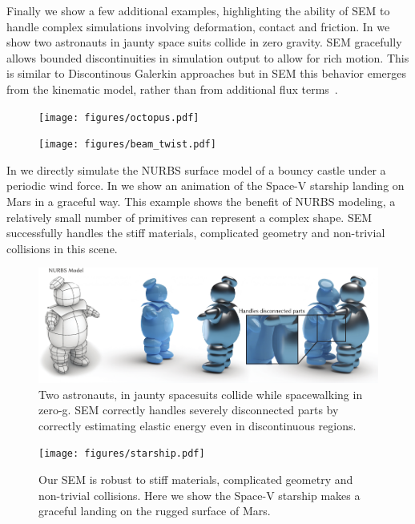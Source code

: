 Finally we show a few additional examples, highlighting the ability of SEM to handle complex simulations involving deformation, contact and friction.
In  we show two astronauts in jaunty space suits collide in zero gravity. 
SEM gracefully allows bounded discontinuities in simulation output to allow for rich motion. 
This is similar to Discontinous Galerkin approaches but in SEM this behavior emerges from the kinematic model, rather than from additional flux terms~\cite{kaufmann2009flexible}.

\begin{figure}[h]
  \texttt{[image: figures/octopus.pdf]}
  \caption{}
  \label{fig:octopus}
\end{figure}

\begin{figure}[h]
  \texttt{[image: figures/beam\_twist.pdf]}
  \caption{}
  \label{fig:twist}
\end{figure}

In  we directly simulate the NURBS surface model of a bouncy castle under a periodic wind force. 
In  we show an animation of the Space-V starship landing on Mars in a graceful way. 
This example shows the benefit of NURBS modeling, a relatively small number of primitives can represent a complex shape.
SEM successfully handles the stiff materials, complicated geometry and non-trivial collisions in this scene.

\begin{figure}[htp]
  \includegraphics[width=\textwidth]{figures/astronauts.pdf}
  \caption{Two astronauts, in jaunty spacesuits collide while spacewalking in zero-g. SEM correctly handles severely disconnected parts by correctly estimating elastic energy even in discontinuous regions.}
  \label{fig:staypuft}
\end{figure}

\begin{figure}[htp]
  \texttt{[image: figures/starship.pdf]}
  \caption{Our SEM is robust to stiff materials, complicated geometry and non-trivial collisions. Here we show the Space-V starship makes a graceful landing on the rugged surface of Mars. }
  \label{fig:starship}
\end{figure}
